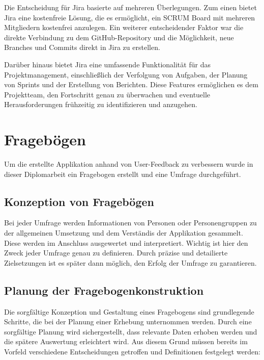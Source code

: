 Die Entscheidung für Jira basierte auf mehreren Überlegungen. Zum einen bietet Jira eine kostenfreie Lösung, die es
ermöglicht, ein SCRUM Board mit mehreren Mitgliedern kostenfrei anzulegen. Ein weiterer entscheidender Faktor war die
direkte Verbindung zu dem GitHub-Repository und die Möglichkeit, neue Branches und Commits direkt in Jira zu erstellen.

Darüber hinaus bietet Jira eine umfassende Funktionalität für das Projektmanagement, einschließlich der Verfolgung von
Aufgaben, der Planung von Sprints und der Erstellung von Berichten. Diese Features ermöglichen es dem Projektteam, den
Fortschritt genau zu überwachen und eventuelle Herausforderungen frühzeitig zu identifizieren und anzugehen.

\section{Fragebögen}
Um die erstellte Applikation anhand von User-Feedback zu verbessern wurde in dieser Diplomarbeit ein Fragebogen erstellt
und eine Umfrage durchgeführt.

\subsection{Konzeption von Fragebögen}
Bei jeder Umfrage werden Informationen von Personen oder Personengruppen zu der allgemeinen
Umsetzung und dem Verständis der Applikation gesammelt. Diese werden im Anschluss ausgewertet und
interpretiert. Wichtig ist hier den Zweck jeder Umfrage genau zu definieren. Durch präzise und
detailierte Zielsetzungen ist es später dann möglich, den Erfolg der Umfrage zu garantieren.

\subsection{Planung der Fragebogenkonstruktion}
Die sorgfältige Konzeption und Gestaltung eines Fragebogens sind grundlegende Schritte, die bei der Planung einer Erhebung unternommen werden.
Durch eine sorgfältige Planung wird sichergestellt, dass relevante Daten erhoben werden und die spätere Auswertung erleichtert wird.
Aus diesem Grund müssen bereits im Vorfeld verschiedene Entscheidungen getroffen und Definitionen festgelegt werden:

